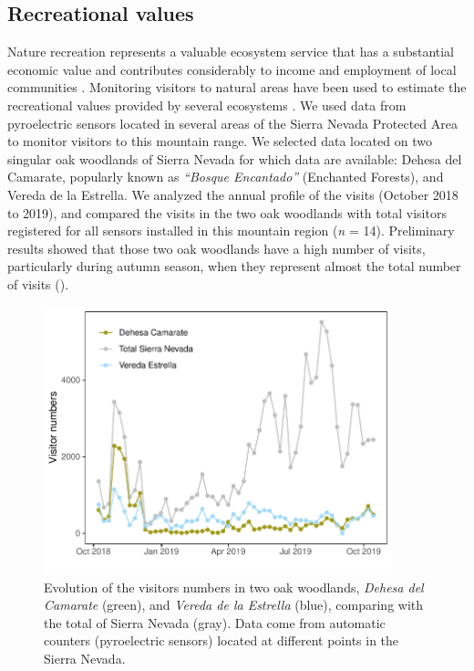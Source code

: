 \subsection{Recreational values}\label{sec:es:cultural-recreation}
Nature recreation represents a valuable ecosystem service that has a substantial economic value and contributes considerably to income and employment of local communities \autocites{Schagneretal2017MonitoringRecreation}. Monitoring visitors to natural areas have been used to estimate the recreational values provided by several ecosystems \autocites{Andersenetal2014MonitoringVisitors,Schagneretal2017MonitoringRecreation}. We used data from pyroelectric sensors located in several areas of the Sierra Nevada Protected Area to monitor visitors to this mountain range. We selected data located on two singular oak woodlands of Sierra Nevada for which data are available: Dehesa del Camarate, popularly known as \emph{``Bosque Encantado''} (Enchanted Forests), and Vereda de la Estrella. We analyzed the annual profile of the visits (October 2018 to 2019), and compared the visits in the two oak woodlands with total visitors registered for all sensors installed in this mountain region (\emph{n} = 14). Preliminary results showed that those two oak woodlands have a high number of visits, particularly during autumn season, when they represent almost the total number of visits (). 

\begin{figure}
    \centering
    \includegraphics[width=0.9\textwidth]{img/es/es-visitorsprofile.pdf}\caption{Evolution of the visitors numbers in two oak woodlands, \emph{Dehesa del Camarate} (green), and \emph{Vereda de la Estrella} (blue), comparing with the total of Sierra Nevada (gray). Data come from automatic counters (pyroelectric sensors) located at different points in the Sierra Nevada.}\label{fig:es:visitorsprofile}
\end{figure}

